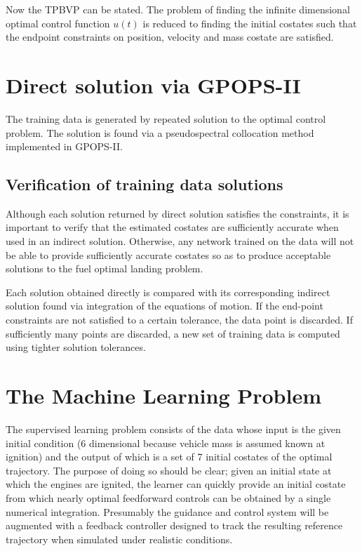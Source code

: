 \documentclass[10pt,a4paper]{article}
\begin{document}
Now the TPBVP can be stated. The problem of finding the infinite dimensional optimal control function $u(t)$ is reduced to finding the initial costates such that the endpoint constraints on position, velocity and mass costate are satisfied.

\section{Direct solution via GPOPS-II}
The training data is generated by repeated solution to the optimal control problem. The solution is found via a pseudospectral collocation method implemented in GPOPS-II. 

\subsection{Verification of training data solutions}
Although each solution returned by direct solution satisfies the constraints, it is important to verify that the estimated costates are sufficiently accurate when used in an indirect solution. Otherwise, any network trained on the data will not be able to provide sufficiently accurate costates so as to produce acceptable solutions to the fuel optimal landing problem.

Each solution obtained directly is compared with its corresponding indirect solution found via integration of the equations of motion. If the end-point constraints are not satisfied to a certain tolerance, the data point is discarded. If sufficiently many points are discarded, a new set of training data is computed using tighter solution tolerances. 
	
 
\section{The Machine Learning Problem}
The supervised learning problem consists of the data whose input is the given initial condition (6 dimensional because vehicle mass is assumed known at ignition) and the output of which is a set of 7 initial costates of the optimal trajectory. The purpose of doing so should be clear; given an initial state at which the engines are ignited, the learner can quickly provide an initial costate from which nearly optimal feedforward controls can be obtained by a single numerical integration. Presumably the guidance and control system will be augmented with a feedback controller designed to track the resulting reference trajectory when simulated under realistic conditions.
\end{document}

